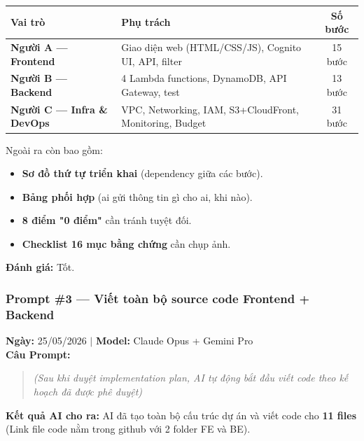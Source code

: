 \documentclass[13pt]{article}
\begin{document}
\begin{longtable}{|p{}|p{}|c|}
\hline
\textbf{Vai trò} & \textbf{Phụ trách} & \textbf{Số bước} \\ \hline
\endhead
\textbf{Người A — Frontend} & Giao diện web (HTML/CSS/JS), Cognito UI, API, filter & 15 bước \\ \hline
\textbf{Người B — Backend} & 4 Lambda functions, DynamoDB, API Gateway, test & 13 bước \\ \hline
\textbf{Người C — Infra \& DevOps} & VPC, Networking, IAM, S3+CloudFront, Monitoring, Budget & 31 bước \\ \hline
\end{longtable}
Ngoài ra còn bao gồm:
\begin{itemize}
    \item \textbf{Sơ đồ thứ tự triển khai} (dependency giữa các bước).
    \item \textbf{Bảng phối hợp} (ai gửi thông tin gì cho ai, khi nào).
    \item \textbf{8 điểm "0 điểm"} cần tránh tuyệt đối.
    \item \textbf{Checklist 16 mục bằng chứng} cần chụp ảnh.
\end{itemize}
\textbf{Đánh giá:} Tốt.

\subsubsection{Prompt \#3 — Viết toàn bộ source code Frontend + Backend}
\textbf{Ngày:} 25/05/2026 $|$ \textbf{Model:} Claude Opus + Gemini Pro\\
\textbf{Câu Prompt:}
\begin{quote}
\textit{(Sau khi duyệt implementation plan, AI tự động bắt đầu viết code theo kế hoạch đã được phê duyệt)}
\end{quote}
\textbf{Kết quả AI cho ra:}
AI đã tạo toàn bộ cấu trúc dự án và viết code cho \textbf{11 files} (Link file code nằm trong github với 2 folder FE và BE).
\end{document}
